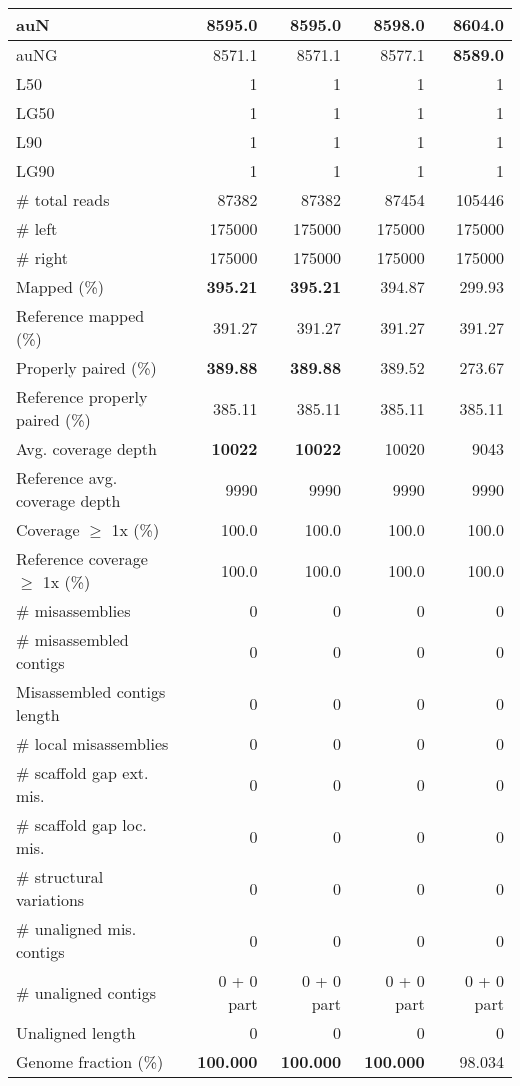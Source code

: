 \documentclass[12pt,a4paper]{article}
\begin{document}
\begin{table}[ht]
\begin{center}
\begin{tabular}{|l*{4}{|r}|}
auN & 8595.0 & 8595.0 & 8598.0 & {\bf 8604.0} \\ \hline
auNG & 8571.1 & 8571.1 & 8577.1 & {\bf 8589.0} \\ \hline
L50 & 1 & 1 & 1 & 1 \\ \hline
LG50 & 1 & 1 & 1 & 1 \\ \hline
L90 & 1 & 1 & 1 & 1 \\ \hline
LG90 & 1 & 1 & 1 & 1 \\ \hline
\# total reads & 87382 & 87382 & 87454 & 105446 \\ \hline
\# left & 175000 & 175000 & 175000 & 175000 \\ \hline
\# right & 175000 & 175000 & 175000 & 175000 \\ \hline
Mapped (\%) & {\bf 395.21} & {\bf 395.21} & 394.87 & 299.93 \\ \hline
Reference mapped (\%) & 391.27 & 391.27 & 391.27 & 391.27 \\ \hline
Properly paired (\%) & {\bf 389.88} & {\bf 389.88} & 389.52 & 273.67 \\ \hline
Reference properly paired (\%) & 385.11 & 385.11 & 385.11 & 385.11 \\ \hline
Avg. coverage depth & {\bf 10022} & {\bf 10022} & 10020 & 9043 \\ \hline
Reference avg. coverage depth & 9990 & 9990 & 9990 & 9990 \\ \hline
Coverage $\geq$ 1x (\%) & 100.0 & 100.0 & 100.0 & 100.0 \\ \hline
Reference coverage $\geq$ 1x (\%) & 100.0 & 100.0 & 100.0 & 100.0 \\ \hline
\# misassemblies & 0 & 0 & 0 & 0 \\ \hline
\# misassembled contigs & 0 & 0 & 0 & 0 \\ \hline
Misassembled contigs length & 0 & 0 & 0 & 0 \\ \hline
\# local misassemblies & 0 & 0 & 0 & 0 \\ \hline
\# scaffold gap ext. mis. & 0 & 0 & 0 & 0 \\ \hline
\# scaffold gap loc. mis. & 0 & 0 & 0 & 0 \\ \hline
\# structural variations & 0 & 0 & 0 & 0 \\ \hline
\# unaligned mis. contigs & 0 & 0 & 0 & 0 \\ \hline
\# unaligned contigs & 0 + 0 part & 0 + 0 part & 0 + 0 part & 0 + 0 part \\ \hline
Unaligned length & 0 & 0 & 0 & 0 \\ \hline
Genome fraction (\%) & {\bf 100.000} & {\bf 100.000} & {\bf 100.000} & 98.034 \\ \hline

\end{tabular}
\end{center}
\end{table}
\end{document}
